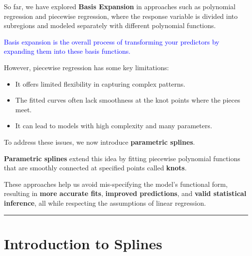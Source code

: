 \documentclass[
  letterpaper,
  DIV=11,
  numbers=noendperiod]{scrreprt}
\providecommand{\tightlist}{%
  \setlength{\itemsep}{0pt}\setlength{\parskip}{0pt}}\usepackage{longtable,booktabs,array}
\begin{document}
\begin{tcolorbox}[enhanced jigsaw, breakable, colbacktitle=quarto-callout-important-color!10!white, left=2mm, colframe=quarto-callout-important-color-frame, opacityback=0, coltitle=black, colback=white, rightrule=.15mm, title=\textcolor{quarto-callout-important-color}{\faExclamation}\hspace{0.5em}{Motivation:}, titlerule=0mm, opacitybacktitle=0.6, leftrule=.75mm, toprule=.15mm, arc=.35mm, bottomtitle=1mm, toptitle=1mm, bottomrule=.15mm]

So far, we have explored \textbf{Basis Expansion} in approaches such as
polynomial regression and piecewise regression, where the response
variable is divided into subregions and modeled separately with
different polynomial functions.

\textcolor{blue}{Basis expansion is the overall process of transforming your predictors by expanding them into these basis functions.}

However, piecewise regression has some key limitations:

\begin{itemize}
\tightlist
\item
  It offers limited flexibility in capturing complex patterns.\\
\item
  The fitted curves often lack smoothness at the knot points where the
  pieces meet.\\
\item
  It can lead to models with high complexity and many parameters.
\end{itemize}

To address these issues, we now introduce \textbf{parametric splines}.

\textbf{Parametric splines} extend this idea by fitting piecewise
polynomial functions that are smoothly connected at specified points
called \textbf{knots}.

These approaches help us avoid mis-specifying the model's functional
form, resulting in \textbf{more accurate fits}, \textbf{improved
predictions}, and \textbf{valid statistical inference}, all while
respecting the assumptions of linear regression.

\end{tcolorbox}

\begin{center}\rule{0.5\linewidth}{0.5pt}\end{center}

\hypertarget{introduction-to-splines}{%
\section*{Introduction to Splines}\label{introduction-to-splines}}
\end{document}
